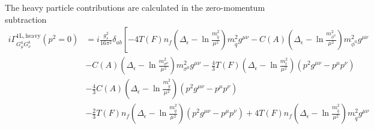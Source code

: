 The heavy particle contributions are calculated in the zero-momentum subtraction
\begin{align}
i\Gamma^{\mathrm{1L,heavy}}_{G_\mu^a G_\nu^b}(p^2 = 0)&= i\frac{g_s^2}{16\pi^2}\delta_{ab} \left[ - 4 T(F)n_f \left( \Delta_\epsilon - \ln \frac{m_{\tilde{q}}^2}{\mu^2} \right)m_{\tilde{q}}^2 g^{\mu\nu} - C(A) \left( \Delta_\epsilon - \ln \frac{m_{\phi^0}^2}{\mu^2} \right)m_{\phi^0}^2 g^{\mu\nu} \right.\nonumber\\
&- C(A) \left( \Delta_\epsilon - \ln \frac{m_{\sigma^0}^2}{\mu^2} \right)m_{\sigma^0}^2 g^{\mu\nu} - \frac{4}{3}T(F)\left( \Delta_\epsilon - \ln \frac{m_t^2}{\mu^2} \right)(p^2g^{\mu\nu}-p^\mu p^\nu)\nonumber\\
& - \frac{4}{3} C(A) \left( \Delta_\epsilon - \ln \frac{m_{\tilde{g}}^2}{\mu^2} \right)(p^2g^{\mu\nu}-p^\mu p^\nu)\nonumber\\
& -\frac{2}{3}T(F) n_f \left( \Delta_\epsilon - \ln \frac{m_{\tilde{q}}^2}{\mu^2} \right)(p^2g^{\mu\nu}-p^\mu p^\nu) + 4T(F)n_f \left( \Delta_\epsilon - \ln \frac{m_{\tilde{q}}^2}{\mu^2} \right)m_{\tilde{q}}^2 g^{\mu\nu} \nonumber\\

\end{align}
